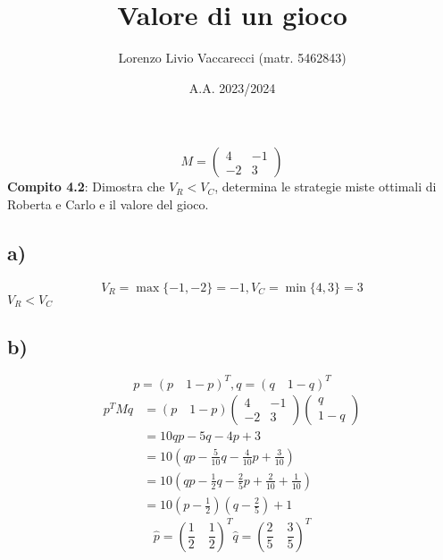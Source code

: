 \documentclass[12pt]{article}
\title{Valore di un gioco}
\author{Lorenzo Livio Vaccarecci (matr. 5462843)}
\date{A.A. 2023/2024}
\begin{document}
\maketitle
\begin{equation*}
    M =
    \begin{pmatrix}
        4 & -1 \\
        -2 & 3
    \end{pmatrix}
\end{equation*}
\textbf{Compito 4.2}: Dimostra che $V_{R}<V_{C}$, determina le strategie miste ottimali di Roberta e Carlo e il valore del gioco.
\subsection*{a)}
\begin{equation*}
    V_{R} = \max\{-1,-2\}=-1, V_{C} = \min\{4,3\}=3
\end{equation*}
$V_{R}<V_{C}$
\subsection*{b)}
\begin{equation*}
    p = (p \quad 1-p)^{T}, q = (q \quad 1-q)^{T}
\end{equation*}
\vspace{0.01cm}
\begin{equation*}
    \begin{aligned}
        p^{T}Mq & = (p \quad 1-p) \begin{pmatrix}
            4 & -1 \\
            -2 & 3
        \end{pmatrix} \begin{pmatrix}
            q \\
            1-q
        \end{pmatrix} \\
        & = 10qp - 5q - 4p + 3 \\
        & = 10\left(qp-\frac{5}{10}q-\frac{4}{10}p+\frac{3}{10}\right) \\
        & =10\left(qp-\frac{1}{2}q-\frac{2}{5}p+\frac{2}{10}+\frac{1}{10}\right) \\
        & = 10\left(p-\frac{1}{2}\right)\left(q-\frac{2}{5}\right)+1
    \end{aligned}
\end{equation*}
\begin{equation*}
    \hat{p} = \left(\frac{1}{2}\quad\frac{1}{2}\right)^{T}
    \hat{q} = \left(\frac{2}{5}\quad\frac{3}{5}\right)^{T}
\end{equation*}
\newpage
\end{document}
